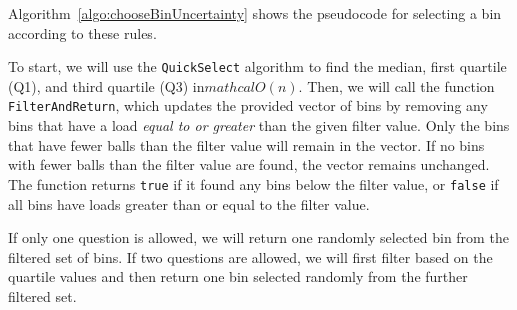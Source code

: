 \documentclass[a4paper, 11pt]{article}
\begin{document}
Algorithm~\ref{algo:chooseBinUncertainty} shows the pseudocode for selecting a bin according to these rules.

To start, we will use the \texttt{QuickSelect} algorithm to find the median, first quartile (Q1), and third quartile (Q3) in\(mathcal{O}(n)\). Then, we will call the function \texttt{FilterAndReturn}, which updates the provided vector of bins by removing any bins that have a load \emph{equal to or greater} than the given filter value. Only the bins that have fewer balls than the filter value will remain in the vector. If no bins with fewer balls than the filter value are found, the vector remains unchanged. The function returns \texttt{true} if it found any bins below the filter value, or \texttt{false} if all bins have loads greater than or equal to the filter value.

If only one question is allowed, we will return one randomly selected bin from the filtered set of bins. If two questions are allowed, we will first filter based on the quartile values and then return one bin selected randomly from the further filtered set.
\end{document}
